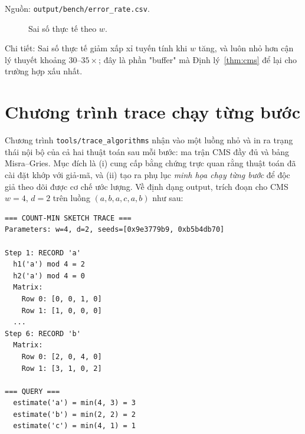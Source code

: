 \noindent Nguồn: \texttt{output/bench/error\_rate.csv}.

\begin{figure}[H]
  \centering
  \caption{Sai số thực tế theo $w$.}
  \label{fig:bench-error}
\end{figure}

\noindent Chi tiết: Sai số thực tế giảm xấp xỉ tuyến tính khi $w$ tăng, và luôn nhỏ hơn cận lý thuyết khoảng $30$--$35\times$; đây là phần "buffer" mà Định lý~\ref{thm:cms} để lại cho trường hợp xấu nhất.

\section{Chương trình trace chạy từng bước}

Chương trình \texttt{tools/trace\_algorithms} nhận vào một luồng nhỏ và in ra trạng thái nội bộ của cả hai thuật toán sau mỗi bước: ma trận CMS đầy đủ và bảng Misra--Gries. Mục đích là (i) cung cấp bằng chứng trực quan rằng thuật toán đã cài đặt khớp với giả-mã, và (ii) tạo ra phụ lục \textit{minh họa chạy từng bước} để độc giả theo dõi được cơ chế ước lượng. Về định dạng output, trích đoạn cho CMS $w = 4$, $d = 2$ trên luồng $(a, b, a, c, a, b)$ như sau:

\begin{lstlisting}[style=pseudo, caption={Trích output trace CMS}, label=lst:trace-excerpt]
=== COUNT-MIN SKETCH TRACE ===
Parameters: w=4, d=2, seeds=[0x9e3779b9, 0xb5b4db70]

Step 1: RECORD 'a'
  h1('a') mod 4 = 2
  h2('a') mod 4 = 0
  Matrix:
    Row 0: [0, 0, 1, 0]
    Row 1: [1, 0, 0, 0]
  ...
Step 6: RECORD 'b'
  Matrix:
    Row 0: [2, 0, 4, 0]
    Row 1: [3, 1, 0, 2]

=== QUERY ===
  estimate('a') = min(4, 3) = 3
  estimate('b') = min(2, 2) = 2
  estimate('c') = min(4, 1) = 1
\end{lstlisting}

